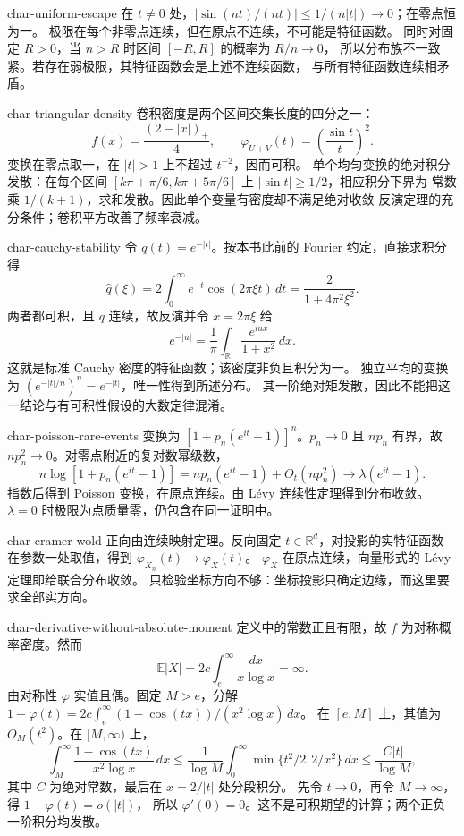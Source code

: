 \begin{solution}{char-uniform-escape}
在 $t\ne0$ 处，$|\sin(nt)/(nt)|\le1/(n|t|)\to0$；在零点恒为一。
极限在每个非零点连续，但在原点不连续，不可能是特征函数。
同时对固定 $R>0$，当 $n>R$ 时区间 $[-R,R]$ 的概率为 $R/n\to0$，
所以分布族不一致紧。若存在弱极限，其特征函数会是上述不连续函数，
与所有特征函数连续相矛盾。
\end{solution}

\begin{solution}{char-triangular-density}
卷积密度是两个区间交集长度的四分之一：
\[
 f(x)=\frac{(2-|x|)_+}{4},\qquad
 \varphi_{U+V}(t)=\left(\frac{\sin t}{t}\right)^2.
\]
变换在零点取一，在 $|t|>1$ 上不超过 $t^{-2}$，因而可积。
单个均匀变换的绝对积分发散：在每个区间
$[k\pi+\pi/6,k\pi+5\pi/6]$ 上 $|\sin t|\ge1/2$，相应积分下界为
常数乘 $1/(k+1)$，求和发散。因此单个变量有密度却不满足绝对收敛
反演定理的充分条件；卷积平方改善了频率衰减。
\end{solution}

\begin{solution}{char-cauchy-stability}
令 $q(t)=e^{-|t|}$。按本书此前的 Fourier 约定，直接求积分得
\[
 \widehat q(\xi)=2\int_0^\infty e^{-t}\cos(2\pi\xi t)\,dt
             =\frac2{1+4\pi^2\xi^2}.
\]
两者都可积，且 $q$ 连续，故反演并令 $x=2\pi\xi$ 给
\[
 e^{-|u|}=\frac1\pi\int_\mathbb R\frac{e^{iux}}{1+x^2}\,dx.
\]
这就是标准 Cauchy 密度的特征函数；该密度非负且积分为一。
独立平均的变换为 $(e^{-|t|/n})^n=e^{-|t|}$，唯一性得到所述分布。
其一阶绝对矩发散，因此不能把这一结论与有可积性假设的大数定律混淆。
\end{solution}

\begin{solution}{char-poisson-rare-events}
变换为 $[1+p_n(e^{it}-1)]^n$。$p_n\to0$ 且 $np_n$ 有界，故
$np_n^2\to0$。对零点附近的复对数幂级数，
\[
 n\log[1+p_n(e^{it}-1)]
   =np_n(e^{it}-1)+O_t(np_n^2)\longrightarrow\lambda(e^{it}-1).
\]
指数后得到 Poisson 变换，在原点连续。由 Lévy 连续性定理得到分布收敛。
$\lambda=0$ 时极限为点质量零，仍包含在同一证明中。
\end{solution}

\begin{solution}{char-cramer-wold}
正向由连续映射定理。反向固定 $t\in\mathbb R^d$，对投影的实特征函数
在参数一处取值，得到 $\varphi_{X_n}(t)\to\varphi_X(t)$。
$\varphi_X$ 在原点连续，向量形式的 Lévy 定理即给联合分布收敛。
只检验坐标方向不够：坐标投影只确定边缘，而这里要求全部实方向。
\end{solution}

\begin{solution}{char-derivative-without-absolute-moment}
定义中的常数正且有限，故 $f$ 为对称概率密度。然而
\[
 \mathbb E|X|=2c\int_e^\infty\frac{dx}{x\log x}=\infty.
\]
由对称性 $\varphi$ 实值且偶。固定 $M>e$，分解
$1-\varphi(t)=2c\int_e^\infty(1-\cos(tx))/(x^2\log x)\,dx$。
在 $[e,M]$ 上，其值为 $O_M(t^2)$。在 $[M,\infty)$ 上，
\[
 \int_M^\infty\frac{1-\cos(tx)}{x^2\log x}\,dx
 \le\frac1{\log M}\int_0^\infty\min\{t^2/2,2/x^2\}\,dx
 \le\frac{C|t|}{\log M},
\]
其中 $C$ 为绝对常数，最后在 $x=2/|t|$ 处分段积分。
先令 $t\to0$，再令 $M\to\infty$，得 $1-\varphi(t)=o(|t|)$，
所以 $\varphi'(0)=0$。这不是可积期望的计算；两个正负一阶积分均发散。
\end{solution}

